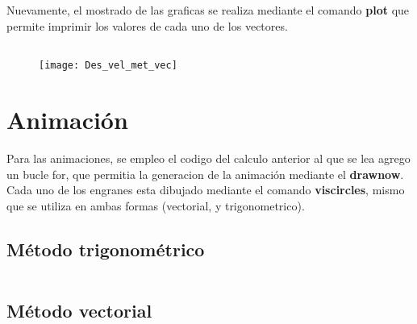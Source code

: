 \documentclass[12pt, final]{extarticle}
\begin{document}
Nuevamente, el mostrado de las graficas se realiza mediante el comando
\textbf{plot} que permite imprimir los valores de cada uno de los vectores.
{\small
\inputminted{matlab}{Codigos/ADA5_metodo_vec.m}}

\begin{figure}[ht]
    \centering
    \texttt{[image: Des\_vel\_met\_vec]}
\end{figure}

\newpage
\section{Animación}

Para las animaciones, se empleo el codigo del calculo anterior al que se lea
agrego un bucle for, que permitia la generacion de la animación mediante el
\textbf{drawnow}. Cada uno de los engranes esta dibujado mediante el comando
\textbf{viscircles}, mismo que se utiliza en ambas formas (vectorial, y
trigonometrico).
\subsection{Método trigonométrico}
{\small
\inputminted{matlab}{Codigos/ADA5_metodo_trig_animacion.m}}

\newpage
\subsection{Método vectorial}

{\small
\inputminted{matlab}{Codigos/ADA5_metodo_vec_animacion.m}}

\nocite{*}
\vfill


\end{document}
